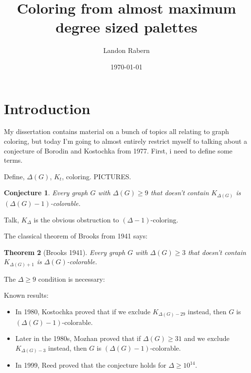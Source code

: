 \documentclass[12pt]{article}
\title{Coloring from almost maximum degree sized palettes}
\author{Landon Rabern}
\date{\today}
\theoremstyle{plain}
\newtheorem{thm}{Theorem}[section]
\newtheorem{conjecture}[thm]{Conjecture}
\theoremstyle{definition}
\theoremstyle{remark}
\begin{document}
\maketitle

\section{Introduction}
My dissertation contains material on a bunch of topics all relating to graph coloring, but today I'm going to almost entirely restrict myself to talking about a conjecture of Borodin and Kostochka from 1977.  First, i need to define some terms.

Define, $\Delta(G)$, $K_t$, coloring.  PICTURES.

\begin{conjecture}
Every graph $G$ with $\Delta(G) \geq 9$ that doesn't contain $K_{\Delta(G)}$ is $(\Delta(G)-1)$-colorable.
\end{conjecture}

Talk, $K_\Delta$ is the obvious obstruction to $(\Delta-1)$-coloring.

The classical theorem of Brooks from 1941 says:

\begin{thm}[Brooks 1941]
Every graph $G$ with $\Delta(G) \geq 3$ that doesn't contain $K_{\Delta(G) + 1}$ is $\Delta(G)$-colorable.
\end{thm} 

The $\Delta \geq 9$ condition is necessary:



\bigskip
\noindent Known results:
\begin{itemize}
\item In 1980, Kostochka proved that if we exclude $K_{\Delta(G)-29}$ instead, then $G$ is $(\Delta(G)-1)$-colorable.
\item Later in the 1980s, Mozhan proved that if $\Delta(G) \geq 31$ and we exclude $K_{\Delta(G)-3}$ instead, then $G$ is $(\Delta(G)-1)$-colorable.
\item In 1999, Reed proved that the conjecture holds for $\Delta \geq 10^{14}$.  
\end{itemize}
\end{document}
